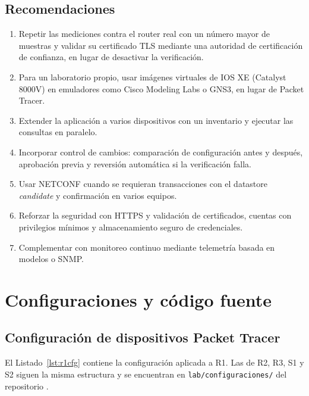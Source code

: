 \subsection{Recomendaciones}
\begin{enumerate}
  \item Repetir las mediciones contra el router real con un número mayor de muestras y validar su certificado TLS mediante una autoridad de certificación de confianza, en lugar de desactivar la verificación.
  \item Para un laboratorio propio, usar imágenes virtuales de IOS XE (Catalyst 8000V) en emuladores como Cisco Modeling Labs o GNS3, en lugar de Packet Tracer.
  \item Extender la aplicación a varios dispositivos con un inventario y ejecutar las consultas en paralelo.
  \item Incorporar control de cambios: comparación de configuración antes y después, aprobación previa y reversión automática si la verificación falla.
  \item Usar NETCONF cuando se requieran transacciones con el datastore \textit{candidate} y confirmación en varios equipos.
  \item Reforzar la seguridad con HTTPS y validación de certificados, cuentas con privilegios mínimos y almacenamiento seguro de credenciales.
  \item Complementar con monitoreo continuo mediante telemetría basada en modelos o SNMP.
\end{enumerate}

\newpage
\printbibliography[title={Referencias bibliográficas}]

\appendix
\section{Configuraciones y código fuente}

\subsection{Configuración de dispositivos Packet Tracer}
El Listado~\ref{lst:r1cfg} contiene la configuración aplicada a R1. Las de R2, R3, S1 y S2 siguen la misma estructura y se encuentran en \texttt{lab/configuraciones/} del repositorio \parencite{repositorio}.

